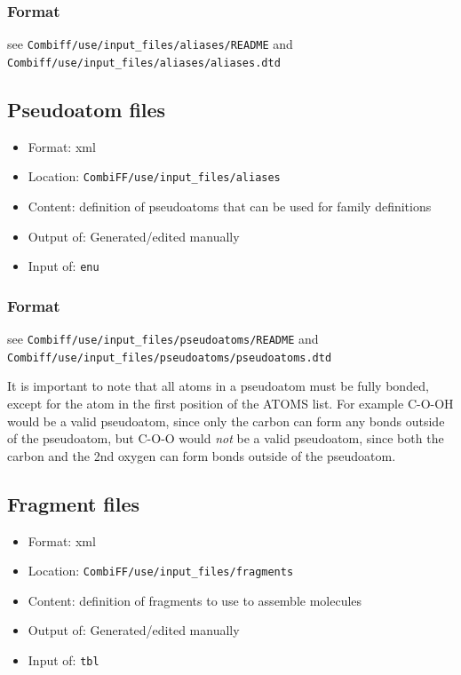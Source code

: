 \documentclass[a4paper,11pt]{article}
\begin{document}
\subsubsection{Format}
see \texttt{Combiff/use/input\_files/aliases/README} and \texttt{Combiff/use/input\_files/aliases/aliases.dtd}


\subsection{Pseudoatom files}\label{sec:filetype_pst}
\label{filetype_pst}

\begin{itemize}
\item Format: xml
\item Location: \texttt{CombiFF/use/input\_files/aliases}
\item Content: definition of pseudoatoms that can be used for family definitions
\item Output of: Generated/edited manually
\item Input of: {\texttt{enu}}
\end{itemize}

\subsubsection{Format}
see \texttt{Combiff/use/input\_files/pseudoatoms/README} and \texttt{Combiff/use/input\_files/pseudoatoms/pseudoatoms.dtd}

{
It is important to note that all atoms in a pseudoatom must be fully bonded, except for the atom in the first position of the ATOMS list. For example C-O-OH would be a valid pseudoatom, since only the carbon can form any bonds outside of the pseudoatom, but C-O-O would \emph{not} be a valid pseudoatom, since both the carbon and the 2nd oxygen can form bonds outside of the pseudoatom.
}

\subsection{Fragment files}
\label{filetype_frs}
\begin{itemize}
\item Format: xml
\item Location: \texttt{CombiFF/use/input\_files/fragments}
\item Content: definition of fragments to use to assemble molecules
\item Output of: Generated/edited manually
\item Input of: {\texttt{tbl}}
\end{itemize}
\end{document}
